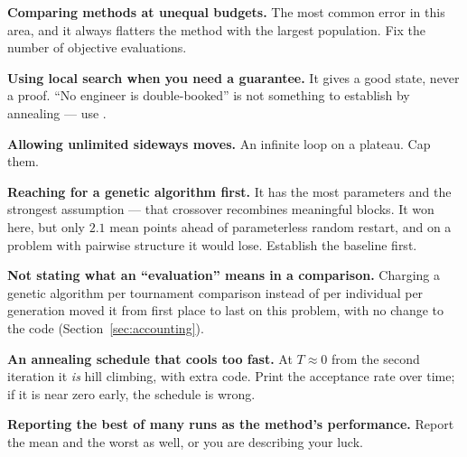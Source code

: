 \begin{pitfall}
\begin{tight}
  \item \textbf{Comparing methods at unequal budgets.} The most common error in this
        area, and it always flatters the method with the largest population. Fix the
        number of objective evaluations.
  \item \textbf{Using local search when you need a guarantee.} It gives a good
        state, never a proof. ``No engineer is double-booked'' is not something to
        establish by annealing --- use .
  \item \textbf{Allowing unlimited sideways moves.} An infinite loop on a plateau.
        Cap them.
  \item \textbf{Reaching for a genetic algorithm first.} It has the most parameters
        and the strongest assumption --- that crossover recombines meaningful blocks.
        It won here, but only $2.1$ mean points ahead of parameterless random
        restart, and on a problem with pairwise structure it would lose. Establish
        the baseline first.
  \item \textbf{Not stating what an ``evaluation'' means in a comparison.} Charging
        a genetic algorithm per tournament comparison instead of per individual per
        generation moved it from first place to last on this problem, with no change
        to the code (Section~\ref{sec:accounting}).
  \item \textbf{An annealing schedule that cools too fast.} At $T \approx 0$ from
        the second iteration it \emph{is} hill climbing, with extra code. Print the
        acceptance rate over time; if it is near zero early, the schedule is wrong.
  \item \textbf{Reporting the best of many runs as the method's performance.} Report
        the mean and the worst as well, or you are describing your luck.
\end{tight}
\end{pitfall}

